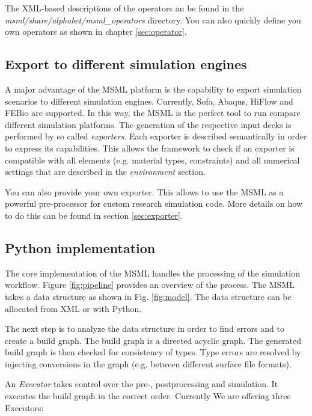 The XML-based descriptions of the operators an be found in the \emph{msml/share/alphabet/msml\_operators} directory. You can also quickly define you own operators as shown in chapter \ref{sec:operator}.

\subsection{Export to different simulation engines}

A major advantage of the MSML platform is the capability to export simulation scenarios to different simulation engines.  Currently, Sofa, Abaqus, HiFlow and FEBio are supported. In this way, the MSML is the perfect tool to run compare different simulation platforms. The generation of the respective input decks is performed by so called \emph{exporters}. Each exporter is described semantically in order to express its capabilities. This allows the framework to check if an exporter is compatible with all elements (e.g. material types, constraints) and all numerical settings that are described in the \emph{environment} section. 

You can also provide your own exporter. This allows to use the MSML as a powerful pre-processor for custom research simulation code. More details on how to do this can be found in section \ref{sec:exporter}.

\subsection{Python implementation}

\label{sec:pipeline}

The core implementation of the MSML handles the processing of the simulation workflow. Figure \ref{fig:pipeline} provides an overview of the process. The MSML takes a data structure as shown in Fig. \ref{fig:model}.
The data structure can be allocated from XML or with Python.

The next step is to analyze the data structure in order to find errors and to create a build graph. The build graph is a directed acyclic graph. The generated build graph is then checked for consistency of types. Type errors are resolved by injecting conversions in the graph (e.g. between different surface file formats).

An \emph{Executor} takes control over the  pre-, postprocessing and simulation. It executes the build graph in the correct
order. Currently We are offering three Executors:

